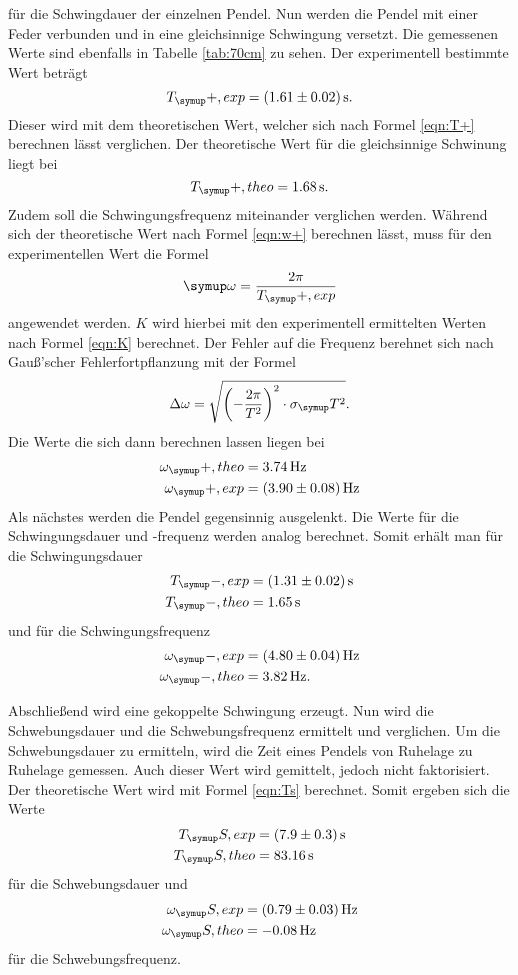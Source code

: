 für die Schwingdauer der einzelnen Pendel. Nun werden die Pendel mit einer Feder
verbunden und in eine gleichsinnige Schwingung versetzt. Die gemessenen Werte
sind ebenfalls in Tabelle \ref{tab:70cm} zu sehen. Der experimentell bestimmte
Wert beträgt
\begin{equation*}
  T_\su{+, exp}=(1.61\pm0.02)\sek.
\end{equation*}
Dieser wird mit dem theoretischen Wert, welcher sich nach Formel \eqref{eqn:T+}
berechnen lässt verglichen. Der theoretische Wert für die gleichsinnige Schwinung
liegt bei
\begin{equation*}
  T_\su{+, theo}=1.68\sek.
\end{equation*}
Zudem soll die Schwingungsfrequenz miteinander verglichen werden. Während sich
der theoretische Wert nach Formel \eqref{eqn:w+}
berechnen lässt, muss für den experimentellen Wert die Formel
\begin{equation}
  \su{\omega}=\frac{2\pi}{T_\su{+, exp}}
  \label{eqn:wexp}
\end{equation}
angewendet werden. $K$ wird hierbei mit den experimentell ermittelten Werten nach
Formel \eqref{eqn:K} berechnet. Der Fehler auf die Frequenz berehnet sich nach
Gauß'scher Fehlerfortpflanzung mit der Formel
\begin{equation}
  \Delta\omega=\sqrt{\biggl(-\frac{2\pi}{T^2}\biggr)^2\cdot\sigma_\su{T}^2}.
\end{equation}
Die Werte die sich dann berechnen lassen liegen bei
\begin{align*}
  \omega_\su{+,theo} &= 3.74\Hz \\
  \omega_\su{+,exp}  &= (3.90 \pm 0.08)\Hz
\end{align*}
Als nächstes werden die Pendel gegensinnig ausgelenkt. Die Werte für die
Schwingungsdauer und -frequenz werden analog berechnet. Somit erhält man für die
Schwingungsdauer
\begin{align*}
  T_\su{-, exp} &= (1.31\pm0.02)\sek \\
  T_\su{-, theo} &= 1.65\sek
\end{align*}
und für die Schwingungsfrequenz
\begin{align*}
  \omega_\su{-, exp}  &= (4.80 \pm 0.04)\Hz \\
  \omega_\su{-, theo} &= 3.82\Hz.
\end{align*}

Abschließend wird eine gekoppelte Schwingung erzeugt. Nun wird die
Schwebungsdauer und die Schwebungsfrequenz ermittelt und verglichen. Um die
Schwebungsdauer zu ermitteln, wird die Zeit eines Pendels von Ruhelage zu
Ruhelage gemessen. Auch dieser Wert wird gemittelt, jedoch nicht faktorisiert.
Der theoretische Wert wird mit Formel \eqref{eqn:Ts} berechnet. Somit ergeben
sich die Werte
\begin{align*}
  T_\su{S, exp} &= (7.9\pm0.3)\sek \\
  T_\su{S,theo} &= 83.16\sek
\end{align*}
für die Schwebungsdauer und
\begin{align*}
  \omega_\su{S, exp} &= (0.79 \pm 0.03)\Hz \\
  \omega_\su{S, theo}&= -0.08\Hz
\end{align*}
für die Schwebungsfrequenz.
